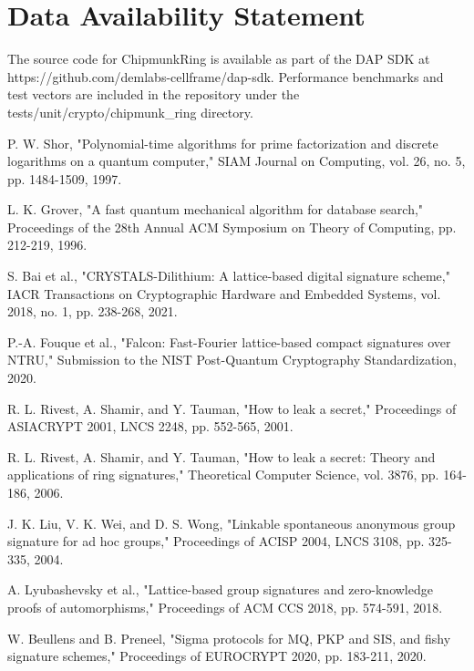\documentclass[11pt,a4paper]{article}
\begin{document}
\section*{Data Availability Statement}

The source code for ChipmunkRing is available as part of the DAP SDK at https://github.com/demlabs-cellframe/dap-sdk. Performance benchmarks and test vectors are included in the repository under the tests/unit/crypto/chipmunk\_ring directory.





\begin{thebibliography}{99}

P. W. Shor, "Polynomial-time algorithms for prime factorization and discrete logarithms on a quantum computer," SIAM Journal on Computing, vol. 26, no. 5, pp. 1484-1509, 1997.

L. K. Grover, "A fast quantum mechanical algorithm for database search," Proceedings of the 28th Annual ACM Symposium on Theory of Computing, pp. 212-219, 1996.

S. Bai et al., "CRYSTALS-Dilithium: A lattice-based digital signature scheme," IACR Transactions on Cryptographic Hardware and Embedded Systems, vol. 2018, no. 1, pp. 238-268, 2021.

P.-A. Fouque et al., "Falcon: Fast-Fourier lattice-based compact signatures over NTRU," Submission to the NIST Post-Quantum Cryptography Standardization, 2020.

R. L. Rivest, A. Shamir, and Y. Tauman, "How to leak a secret," Proceedings of ASIACRYPT 2001, LNCS 2248, pp. 552-565, 2001.

R. L. Rivest, A. Shamir, and Y. Tauman, "How to leak a secret: Theory and applications of ring signatures," Theoretical Computer Science, vol. 3876, pp. 164-186, 2006.

J. K. Liu, V. K. Wei, and D. S. Wong, "Linkable spontaneous anonymous group signature for ad hoc groups," Proceedings of ACISP 2004, LNCS 3108, pp. 325-335, 2004.

A. Lyubashevsky et al., "Lattice-based group signatures and zero-knowledge proofs of automorphisms," Proceedings of ACM CCS 2018, pp. 574-591, 2018.

W. Beullens and B. Preneel, "Sigma protocols for MQ, PKP and SIS, and fishy signature schemes," Proceedings of EUROCRYPT 2020, pp. 183-211, 2020.


\end{thebibliography}
\end{document}
